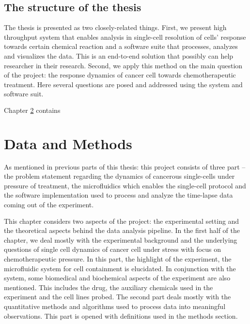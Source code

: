 \documentclass[pdftex,12pt,a4paper]{report}
\begin{document}
\section{The structure of the thesis}


The thesis is presented as two closely-related things. First, we present high throughput system that enables analysis in single-cell resolution of cells' response towards certain chemical reaction and a software suite that processes, analyzes and visualizes the data. This is an end-to-end solution that possibly can help researcher in their research. Second, we apply this method on the main question of the project: the response dynamics of cancer cell towards chemotherapeutic treatment. Here several questions are posed and addressed using the system and software suit.



Chapter \ref{chapter:data_and_method} contains %

\chapter{Data and Methods}

\label{chapter:data_and_method}

As mentioned in previous parts of this thesis: this project consists of three part -- the problem statement regarding the dynamics of cancerous single-cells under pressure of treatment, the microfluidics which enables the single-cell protocol and the software implementation used to process and analyze the time-lapse data coming out of the experiment.

This chapter considers two aspects of the project: the experimental setting and the theoretical aspects behind the data analysis pipeline. In the first half of the chapter, we deal mostly with the experimental background and the underlying questions of single cell dynamics of cancer cell under stress with focus on chemotherapeutic pressure. In this part, the highlight of the experiment, the microfluidic system for cell containment is elucidated. In conjunction with the system, some biomedical and biochemical aspects of the experiment are also mentioned. This includes the drug, the auxiliary chemicals used in the experiment and the cell lines probed. The second part deals mostly with the quantitative methods and algorithms used to process data into meaningful observations. This part is opened with definitions used in the methods section.
\end{document}
